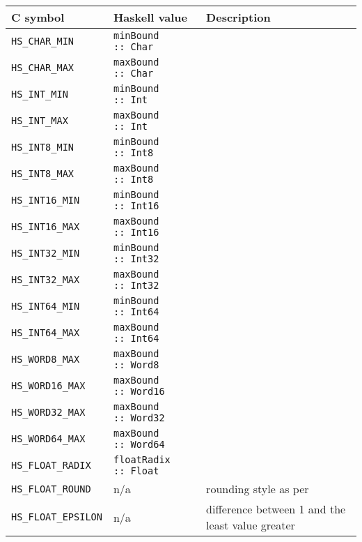 \documentclass[a4paper,twosides]{article}
\newcommand{\code}[1]{\texttt{#1}}      %
\begin{document}
\begin{table}
  \begin{center}
    \begin{tabular}{|l|l|p{30ex}|}
      \hline
      C symbol           & Haskell value & Description\\
      \hline\hline
      \code{HS\_CHAR\_MIN} & \code{minBound ::\ Char}
      & \\
      \hline
      \code{HS\_CHAR\_MAX} & \code{maxBound ::\ Char}
      & \\
      \hline
      \code{HS\_INT\_MIN} & \code{minBound ::\ Int}
      & \\
      \hline
      \code{HS\_INT\_MAX} & \code{maxBound ::\ Int}
      & \\
      \hline
      \code{HS\_INT8\_MIN} & \code{minBound ::\ Int8}
      & \\
      \hline
      \code{HS\_INT8\_MAX} & \code{maxBound ::\ Int8}
      & \\
      \hline
      \code{HS\_INT16\_MIN} & \code{minBound ::\ Int16}
      & \\
      \hline
      \code{HS\_INT16\_MAX} & \code{maxBound ::\ Int16}
      & \\
      \hline
      \code{HS\_INT32\_MIN} & \code{minBound ::\ Int32}
      & \\
      \hline
      \code{HS\_INT32\_MAX} & \code{maxBound ::\ Int32}
      & \\
      \hline
      \code{HS\_INT64\_MIN} & \code{minBound ::\ Int64}
      & \\
      \hline
      \code{HS\_INT64\_MAX} & \code{maxBound ::\ Int64}
      & \\
      \hline
      \code{HS\_WORD8\_MAX} & \code{maxBound ::\ Word8}
      & \\
      \hline
      \code{HS\_WORD16\_MAX} & \code{maxBound ::\ Word16}
      & \\
      \hline
      \code{HS\_WORD32\_MAX} & \code{maxBound ::\ Word32}
      & \\
      \hline
      \code{HS\_WORD64\_MAX} & \code{maxBound ::\ Word64}
      & \\
      \hline
      \code{HS\_FLOAT\_RADIX} & \code{floatRadix ::\ Float}
      & \\
      \hline
      \code{HS\_FLOAT\_ROUND} & n/a
      & rounding style as per~\cite{C99}\\
      \hline
      \code{HS\_FLOAT\_EPSILON} & n/a
      & difference between 1 and the least value greater

\end{tabular}
\end{center}
\end{table}
\end{document}
